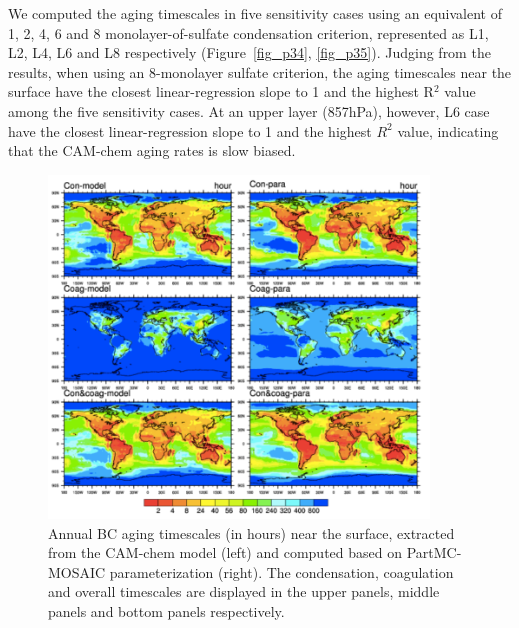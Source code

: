 \documentclass[12pt, fullpage]{uiucthesis2009}
\begin{document}
	We computed the aging timescales in five sensitivity cases using an equivalent of 1, 2, 4, 6 and 8 monolayer-of-sulfate condensation criterion, represented as L1, L2, L4, L6 and L8 respectively (Figure~\ref{fig_p34}, \ref{fig_p35}). Judging from the results, when using an 8-monolayer sulfate criterion, the aging timescales near the surface have the closest linear-regression slope to 1 and the highest R$^2$ value among the five sensitivity cases. At an upper layer (857hPa), however, L6 case have the closest linear-regression slope to 1 and the highest $R^2$ value, indicating that the CAM-chem aging rates is slow biased. 

	
	\begin{figure}[h] 
		\begin{center}
			\includegraphics[width = 0.9\textwidth]{Figure32}
			\caption[Annual BC aging timescales (in hours) near the surface, extracted from the CAM-chem model (left) and computed based on PartMC-MOSAIC parameterization (right). The condensation, coagulation and overall timescales are displayed in the upper panels, middle panels and bottom panels respectively]{\label{fig_p32} Annual BC aging timescales (in hours) near the surface, extracted from the CAM-chem model (left) and computed based on PartMC-MOSAIC parameterization (right). The condensation, coagulation and overall timescales are displayed in the upper panels, middle panels and bottom panels respectively.}
		\end{center}
	\end{figure}
\end{document}

